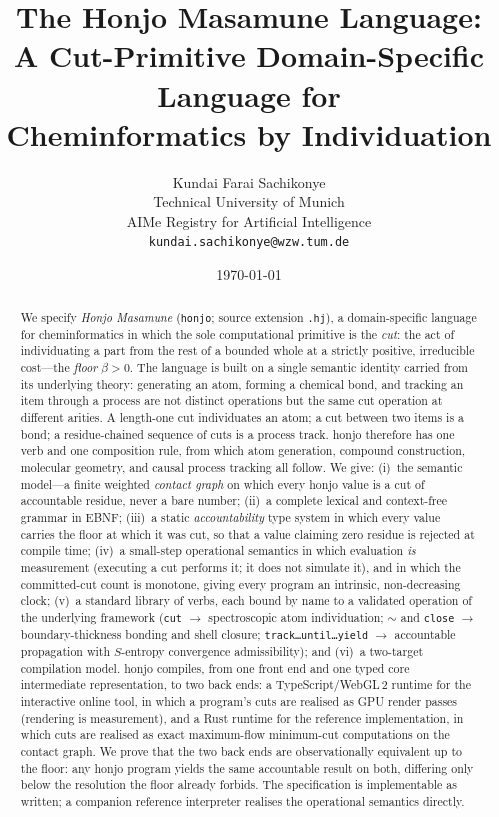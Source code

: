 \documentclass[11pt,a4paper]{article}
\title{\textbf{The Honjo Masamune Language:\\[3pt]
A Cut-Primitive Domain-Specific Language for\\
Cheminformatics by Individuation}}
\author{%
Kundai Farai Sachikonye\\
\small Technical University of Munich\\
\small AIMe Registry for Artificial Intelligence\\
\small \texttt{kundai.sachikonye@wzw.tum.de}}
\date{\today}
\theoremstyle{thmstyle}
\theoremstyle{definition}
\theoremstyle{remark}
\newcommand{\flo}{\beta}
\newcommand{\hj}[1]{\texttt{#1}}
\begin{document}
\maketitle

\begin{abstract}
\noindent
We specify \emph{Honjo Masamune} (\hj{honjo}; source extension
\hj{.hj}), a domain-specific language for cheminformatics in which the
sole computational primitive is the \emph{cut}: the act of individuating
a part from the rest of a bounded whole at a strictly positive,
irreducible cost---the \emph{floor} $\flo>0$. The language is built on a
single semantic identity carried from its underlying theory: generating
an atom, forming a chemical bond, and tracking an item through a process
are not distinct operations but the same cut operation at different
arities. A length-one cut individuates an atom; a cut between two items is
a bond; a residue-chained sequence of cuts is a process track. honjo
therefore has one verb and one composition rule, from which atom
generation, compound construction, molecular geometry, and causal
process tracking all follow. We give: (i)~the semantic model---a finite
weighted \emph{contact graph} on which every honjo value is a cut of
accountable residue, never a bare number; (ii)~a complete lexical and
context-free grammar in EBNF; (iii)~a static \emph{accountability} type
system in which every value carries the floor at which it was cut, so
that a value claiming zero residue is rejected at compile time;
(iv)~a small-step operational semantics in which evaluation \emph{is}
measurement (executing a cut performs it; it does not simulate it), and
in which the committed-cut count is monotone, giving every program an
intrinsic, non-decreasing clock; (v)~a standard library of verbs, each
bound by name to a validated operation of the underlying framework
(\hj{cut} $\to$ spectroscopic atom individuation; \hj{$\sim$} and
\hj{close} $\to$ boundary-thickness bonding and shell closure;
\hj{track\ldots until\ldots yield} $\to$ accountable propagation with
$S$-entropy convergence admissibility); and (vi)~a two-target
compilation model. honjo compiles, from one front end and one typed core
intermediate representation, to two back ends: a TypeScript/WebGL\,2
runtime for the interactive online tool, in which a program's cuts are
realised as GPU render passes (rendering is measurement), and a Rust
runtime for the reference implementation, in which cuts are realised as
exact maximum-flow minimum-cut computations on the contact graph. We
prove that the two back ends are observationally equivalent up to the
floor: any honjo program yields the same accountable result on both,
differing only below the resolution the floor already forbids. The
specification is implementable as written; a companion reference
interpreter realises the operational semantics directly.
\end{abstract}
\end{document}
